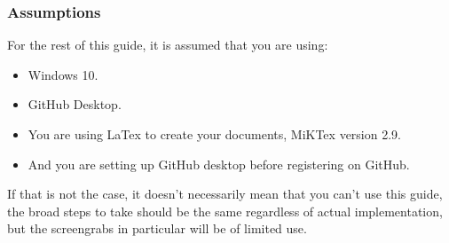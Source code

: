 \documentclass[a4paper, 12pt]{article}
\begin{document}
\subsubsection{Assumptions}
For the rest of this guide, it is assumed that you are using:
\begin{itemize}
\item Windows 10.
\item GitHub Desktop.
\item You are using LaTex to create your documents, MiKTex version 2.9.
\item And you are setting up GitHub desktop before registering on GitHub.
\end{itemize}
If that is not the case, it doesn't necessarily mean that you can't use this guide, the broad steps to take should be the same regardless of actual implementation, but the screengrabs in particular will be of limited use.
\end{document}
